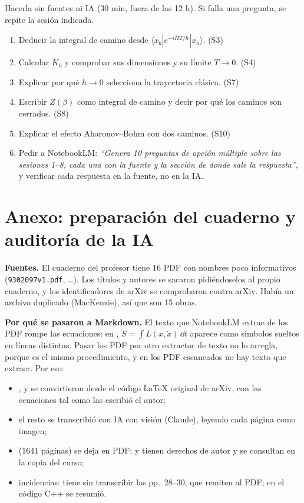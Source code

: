 Hacerla sin fuentes ni IA (30 min, fuera de las 12 h). Si falla una pregunta, se repite la sesión indicada.

\begin{enumerate}
    \item Deducir la integral de camino desde $\langle x_b|e^{-i\hat HT/\hbar}|x_a\rangle$. \hfill (S3)
    \item Calcular $K_0$ y comprobar sus dimensiones y su límite $T\to0$. \hfill (S4)
    \item Explicar por qué $\hbar\to0$ selecciona la trayectoria clásica. \hfill (S7)
    \item Escribir $Z(\beta)$ como integral de camino y decir por qué los caminos son cerrados. \hfill (S8)
    \item Explicar el efecto Aharonov--Bohm con dos caminos. \hfill (S10)
    \item Pedir a NotebookLM: \emph{``Genera 10 preguntas de opción múltiple sobre las sesiones 1--8, cada una con la fuente y la sección de donde sale la respuesta''}, y verificar cada respuesta en la fuente, no en la IA.
\end{enumerate}

\appendix
\section{Anexo: preparación del cuaderno y auditoría de la IA}

\textbf{Fuentes.} El cuaderno del profesor tiene 16 PDF con nombres poco informativos (\texttt{9302097v1.pdf}, \dots). Los títulos y autores se sacaron pidiéndoselos al propio cuaderno, y los identificadores de arXiv se comprobaron contra arXiv. Había un archivo duplicado (MacKenzie), así que son 15 obras.

\textbf{Por qué se pasaron a Markdown.} El texto que NotebookLM extrae de los PDF rompe las ecuaciones: en , $S=\int L(x,\dot x)\,\dd t$ aparece como símbolos sueltos en líneas distintas. Pasar los PDF por otro extractor de texto no lo arregla, porque es el mismo procedimiento, y en los PDF escaneados no hay texto que extraer. Por eso:
\begin{itemize}
    \item {},  y  se convirtieron desde el código \LaTeX{} original de arXiv, con las ecuaciones tal como las escribió el autor;
    \item el resto se transcribió con IA con visión (Claude), leyendo cada página como imagen;
    \item {} (1641 páginas) se deja en PDF;  y  tienen derechos de autor y se consultan en la copia del curso;
    \item incidencias:  tiene sin transcribir las pp.~28--30, que remiten al PDF; en  el código C++ se resumió.
\end{itemize}

